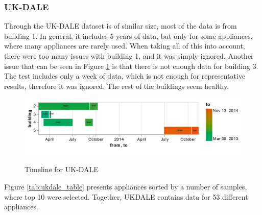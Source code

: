 \subsubsection{UK-DALE} 

Through the UK-DALE \cite{UKDALE} dataset is of similar size, most of the data is from building 1.
In general, it includes 5 years of data, but only for some appliances, where many appliances are rarely used.
When taking all of this into account, there were too many issues with building 1, and it was simply ignored.
Another issue that can be seen in Figure \ref{fig:ukdale_timeline} is that there is not enough data for 
building 3. The test includes only a week of data, which is not enough for representative results, therefore it was ignored.
The rest of the buildings seem healthy.

\begin{figure}[H]
	\centering
	\caption{Timeline for UK-DALE}
	\includegraphics[width=1\textwidth]{Figures/EC/ukdale_timeline.png}
	\label{fig:ukdale_timeline}
\end{figure}

Figure \ref{tab:ukdale_table} presents appliances sorted by a number of samples, where top 10 were selected.
Together, UKDALE contains data for 53 different appliances.

